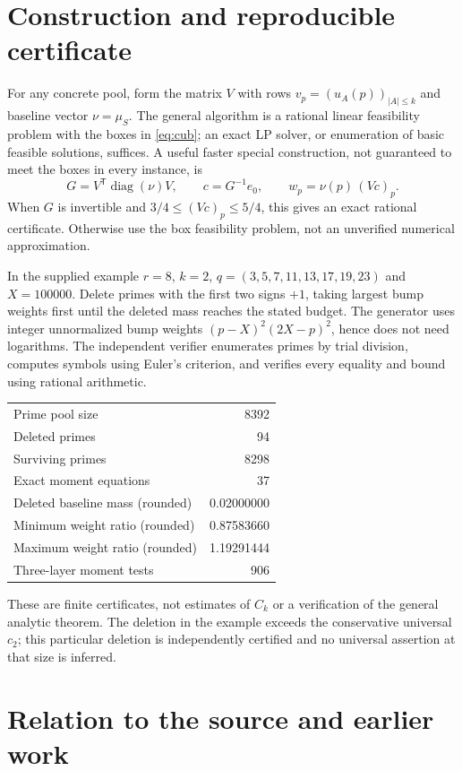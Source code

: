 \documentclass[11pt]{article}
\theoremstyle{remark}\newtheorem{remark}[theorem]{Remark}
\begin{document}
\section{Construction and reproducible certificate}
For any concrete pool, form the matrix $V$ with rows $v_p=(u_A(p))_{|A|\le k}$ and baseline vector $\nu=\mu_S$. The general algorithm is a rational linear feasibility problem with the boxes in \eqref{eq:cub}; an exact LP solver, or enumeration of basic feasible solutions, suffices. A useful faster special construction, not guaranteed to meet the boxes in every instance, is
\[
 G=V^{\mathsf T}\operatorname{diag}(\nu)V,\qquad
 c=G^{-1}e_0,\qquad w_p=\nu(p)\,(Vc)_p.
\]
When $G$ is invertible and $3/4\le(Vc)_p\le5/4$, this gives an exact rational certificate. Otherwise use the box feasibility problem, not an unverified numerical approximation.

In the supplied example $r=8$, $k=2$, $q=(3,5,7,11,13,17,19,23)$ and $X=100000$. Delete primes with the first two signs $+1$, taking largest bump weights first until the deleted mass reaches the stated budget. The generator uses integer unnormalized bump weights $(p-X)^2(2X-p)^2$, hence does not need logarithms. The independent verifier enumerates primes by trial division, computes symbols using Euler's criterion, and verifies every equality and bound using rational arithmetic.
\begin{center}
\begin{tabular}{lr}\toprule
Prime pool size&8392\\
Deleted primes&94\\
Surviving primes&8298\\
Exact moment equations&37\\
Deleted baseline mass (rounded)&0.02000000\\
Minimum weight ratio (rounded)&0.87583660\\
Maximum weight ratio (rounded)&1.19291444\\
Three-layer moment tests&906\\\bottomrule
\end{tabular}
\end{center}
These are finite certificates, not estimates of $C_k$ or a verification of the general analytic theorem. The deletion in the example exceeds the conservative universal $c_2$; this particular deletion is independently certified and no universal assertion at that size is inferred.

\section{Relation to the source and earlier work}\label{sec:source}
\end{document}
